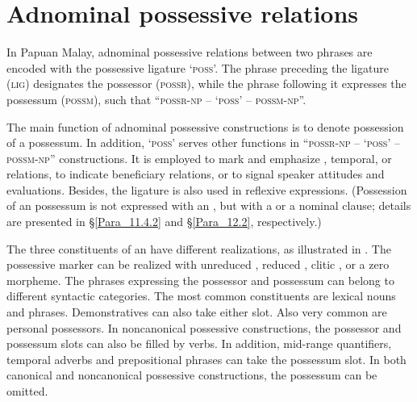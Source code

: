 \chapter[Adnominal possessive relations]{Adnominal possessive relations}
\label{Para_9}
In Papuan Malay, adnominal possessive relations between two  phrases are encoded with the possessive ligature  ‘\textsc{poss}’. The  phrase preceding the ligature (\textsc{lig}) designates the possessor (\textsc{possr}), while the  phrase following it expresses the possessum (\textsc{possm}), such that ``\textsc{possr}{}-\textsc{np} –  ‘\textsc{poss}’ – \textsc{possm}{}-\textsc{np}''.



The main function of adnominal possessive constructions is to denote possession of a  possessum. In addition,  ‘\textsc{poss}’ serves other functions in ``\textsc{possr}{}-\textsc{np} –  ‘\textsc{poss}’ – \textsc{possm}{}-\textsc{np}'' constructions. It is employed to mark and emphasize , temporal, or  relations, to indicate beneficiary relations, or to signal speaker attitudes and evaluations. Besides, the ligature is also used in reflexive expressions. (Possession of an  possessum is not expressed with an , but with a  or a nominal clause; details are presented in §\ref{Para_11.4.2} and §\ref{Para_12.2}, respectively.)



The three constituents of an  have different realizations, as illustrated in . The possessive marker can be realized with unreduced , reduced , clitic , or a zero morpheme. The  phrases expressing the possessor and possessum can belong to different syntactic categories. The most common constituents are lexical nouns and  phrases. Demonstratives can also take either slot. Also very common are personal  possessors. In noncanonical possessive constructions, the possessor and possessum slots can also be filled by verbs. In addition, mid-range quantifiers, temporal adverbs and prepositional phrases can take the possessum slot. In both canonical and noncanonical possessive constructions, the possessum can be omitted.


